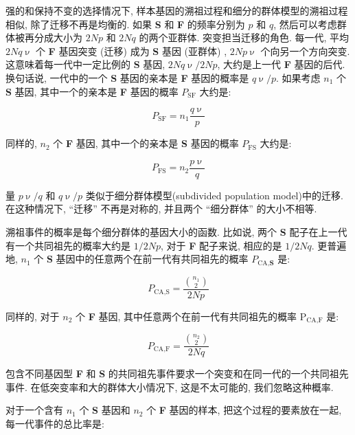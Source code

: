 \documentclass[12pt]{article}
\begin{document}
强的和保持不变的选择情况下, 样本基因的溯祖过程和细分的群体模型的溯祖过程相似, 除了迁移不再是均衡的. 如果 \textbf{S} 和
\textbf{F} 的频率分别为 $p$ 和 $q$, 然后可以考虑群体被再分成大小为 $2Np$ 和 $2Nq$ 的两个亚群体. 突变担当迁移的角色.
每一代, 平均 $2Nq\upnu$ 个 \textbf{F} 基因突变 (迁移) 成为 \textbf{S} 基因 (亚群体) , $2Np\upnu$
个向另一个方向突变. 这意味着每一代中一定比例的 \textbf{S} 基因, $2Nq\upnu/2Np$, 大约是上一代 \textbf{F}
基因的后代. 换句话说, 一代中的一个 \textbf{S} 基因的亲本是 \textbf{F} 基因的概率是 $q\upnu/p$. 如果考虑 $n_{1}$
个 \textbf{S} 基因, 其中一个的亲本是 \textbf{F} 基因的概率 $P_{\text{SF}}$ 大约是:

\begin{equation*}
    P_{\text{SF}}=n_{1}\frac{q\upnu}{p}
\end{equation*}

同样的, $n_{2}$ 个 \textbf{F} 基因, 其中一个的亲本是 \textbf{S} 基因的概率 $P_{\text{FS}}$ 大约是:

\begin{equation*}
    P_{\text{FS}}=n_{2}\frac{p\upnu}{q}
\end{equation*}

量 $p\upnu/q$ 和 $q\upnu/p$ 类似于细分群体模型(subdivided population model)中的迁移. 在这种情况下, ``迁移''
不再是对称的, 并且两个 ``细分群体'' 的大小不相等.

溯祖事件的概率是每个细分群体的基因大小的函数. 比如说, 两个 \textbf{S} 配子在上一代有一个共同祖先的概率大约是 $1/2Np$,
对于 \textbf{F} 配子来说, 相应的是 $1/2Nq$. 更普遍地, $n_{1}$ 个 \textbf{S}
基因中的任意两个在前一代有共同祖先的概率 $P_{\text{CA},\textbf{S}}$ 是:

\begin{equation*}
    P_{\text{CA},\text{S}}=\frac{\binom{n_1}{2}}{2Np}
\end{equation*}

同样的, 对于 $n_{2}$ 个 \textbf{F} 基因, 其中任意两个在前一代有共同祖先的概率 $\text{P}_{\text{CA},\text{F}}$ 是:

\begin{equation*}
    P_{\text{CA},\text{F}}=\frac{\binom{n_2}{2}}{2Nq}
\end{equation*}

包含不同基因型 \textbf{F} 和 \textbf{S} 的共同祖先事件要求一个突变和在同一代的一个共同祖先事件.
在低突变率和大的群体大小情况下, 这是不太可能的, 我们忽略这种概率.

对于一个含有 $n_{1}$ 个 \textbf{S} 基因和 $n_{2}$ 个 \textbf{F} 基因的样本, 把这个过程的要素放在一起,
每一代事件的总比率是:
\end{document}
